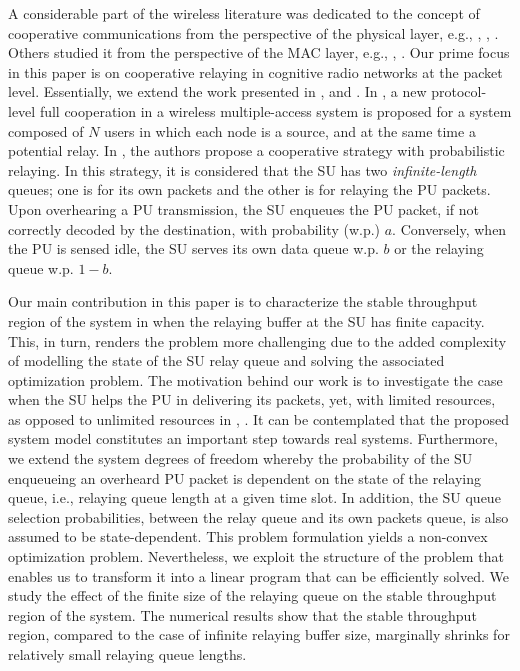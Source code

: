 \documentclass[conference]{IEEEtran}
\begin{document}
A considerable part of the wireless literature was dedicated to the
concept of cooperative communications from the perspective of the
physical layer, e.g., \cite{Tse}, \cite{Kramer}, \cite{Gamal}. Others
studied it from the perspective of the MAC layer, e.g., \cite{Sadek},
\cite{Krikidis}. Our prime focus in this paper is on cooperative
relaying in cognitive radio networks at the packet level.
Essentially, we extend the work presented in
\cite{R_CoopAcc}, \cite{Ashour_Conf} and \cite{Ashour_Journal}. In
\cite{R_CoopAcc}, a new protocol-level full cooperation in a wireless
multiple-access system is proposed for a system composed of $N$
users in which each node is a source, and at the same
time a potential relay. 
In \cite{Ashour_Conf,Ashour_Journal}, the authors propose a 
cooperative strategy with probabilistic relaying. In this
strategy, it is considered that the SU has two
\emph{infinite-length} queues; one is for its own packets and the
other is for relaying the PU packets. Upon overhearing a PU transmission, 
the SU enqueues the PU packet, if not correctly decoded by the destination, 
with probability (w.p.) $a$. Conversely, when the PU
is sensed idle, the SU serves its own data queue w.p. $b$ or the
relaying queue w.p. $1-b$.

Our main contribution in this paper is to characterize the stable throughput 
region of the system in \cite{Ashour_Journal} when the relaying buffer at the SU
has finite capacity. This, in turn, renders the problem more 
challenging due to the added complexity of modelling the state 
of the SU relay queue and solving the associated optimization problem. 
The motivation behind our work is to 
investigate the case when the SU helps the PU in
delivering its packets, yet, with limited resources, as opposed to
unlimited resources in \cite{R_CoopAcc}, \cite{Ashour_Journal}. It
can be contemplated that the proposed system model constitutes an important 
step towards real systems. Furthermore, we extend the system degrees of
freedom whereby the probability of the SU enqueueing an overheard 
PU packet is dependent on the state of the relaying queue, i.e., 
relaying queue length at a given time slot. In addition, 
the SU queue selection probabilities, between the relay queue and 
its own packets queue, is also assumed to be state-dependent.
This problem formulation yields
a non-convex optimization problem. Nevertheless, we exploit the
structure of the problem that enables us to transform it into a
linear program that can be efficiently solved. We study
the effect of the finite size of the relaying queue on the stable
throughput region of the system. The numerical results show that 
the stable throughput region, compared to the case of
infinite relaying buffer size, marginally shrinks for
relatively small relaying queue lengths.
\end{document}

